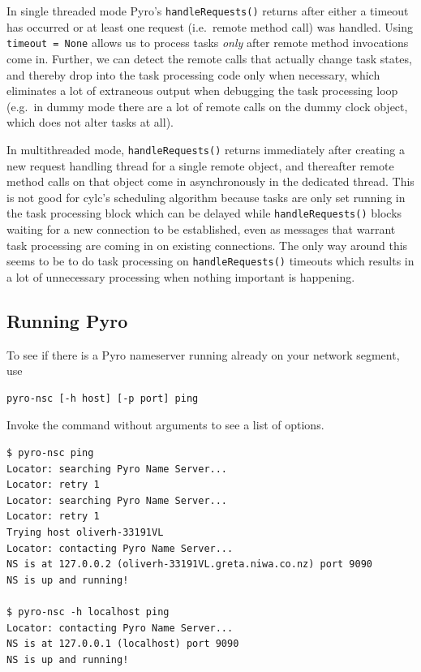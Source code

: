 \documentclass[11pt,a4paper]{article}
\begin{document}
In single threaded mode Pyro's \lstinline=handleRequests()= returns
after either a timeout has occurred or at least one request
(i.e.\ remote method call) was handled. Using \lstinline|timeout = None| 
allows us to process tasks {\em only} after remote method invocations
come in.  Further, we can detect the remote calls that actually change
task states, and thereby drop into the task processing code only when
necessary, which eliminates a lot of extraneous output when debugging
the task processing loop (e.g.\ in dummy mode there are a lot of remote
calls on the dummy clock object, which does not alter tasks at all). 

In multithreaded mode, \lstinline=handleRequests()= returns immediately
after creating a new request handling thread for a single remote object,
and thereafter remote method calls on that object come in asynchronously
in the dedicated thread. This is not good for cylc's scheduling
algorithm because tasks are only set running in the task processing
block which can be delayed while \lstinline=handleRequests()= blocks waiting
for a new connection to be established, even as messages that warrant
task processing are coming in on existing connections. The only way
around this seems to be to do task processing on \lstinline=handleRequests()=
timeouts which results in a lot of unnecessary processing when nothing
important is happening.

\subsection{Running Pyro}
\label{RunningPyro}

To see if there is a Pyro nameserver running already on your network
segment, use 
\begin{lstlisting}
pyro-nsc [-h host] [-p port] ping
\end{lstlisting}
Invoke the command without arguments to see a list of options.

\lstset{language=bash}

\begin{lstlisting}
$ pyro-nsc ping
Locator: searching Pyro Name Server...
Locator: retry 1
Locator: searching Pyro Name Server...
Locator: retry 1
Trying host oliverh-33191VL
Locator: contacting Pyro Name Server...
NS is at 127.0.0.2 (oliverh-33191VL.greta.niwa.co.nz) port 9090
NS is up and running!

$ pyro-nsc -h localhost ping
Locator: contacting Pyro Name Server...
NS is at 127.0.0.1 (localhost) port 9090
NS is up and running!
\end{lstlisting}
\end{document}

